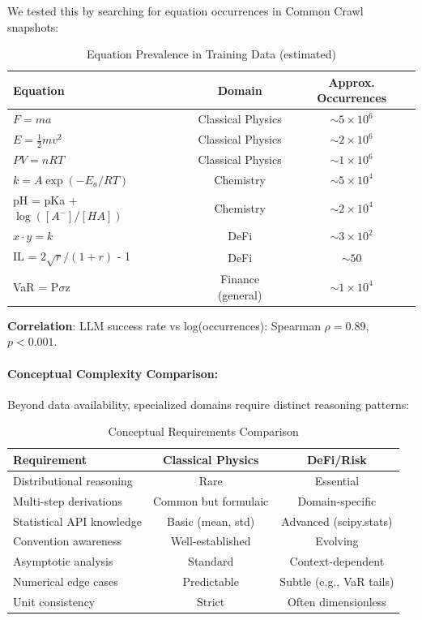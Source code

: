 \documentclass[twoside,11pt]{article}
\begin{document}
We tested this by searching for equation occurrences in Common Crawl snapshots:

\begin{table}[H]
\centering
\caption{Equation Prevalence in Training Data (estimated)}
\label{tab:equation_prevalence}
\begin{tabular}{@{}lcc@{}}
\toprule
\textbf{Equation} & \textbf{Domain} & \textbf{Approx. Occurrences} \\
\midrule
$F = ma$ & Classical Physics & $\sim 5 \times 10^6$ \\
$E = \frac{1}{2}mv^2$ & Classical Physics & $\sim 2 \times 10^6$ \\
$PV = nRT$ & Classical Physics & $\sim 1 \times 10^6$ \\
$k = A\exp(-E_a/RT)$ & Chemistry & $\sim 5 \times 10^4$ \\
pH = pKa + $\log([A^{-}]/[HA])$ & Chemistry & $\sim 2 \times 10^4$ \\
$x \cdot y = k$ & DeFi & $\sim 3 \times 10^2$ \\
IL = 2$\sqrt{r}/(1+r)$ - 1 & DeFi & $\sim 50$ \\
VaR = P$\sigma$z & Finance (general) & $\sim 1 \times 10^4$ \\
\bottomrule
\end{tabular}
\end{table}

\textbf{Correlation}: LLM success rate vs log(occurrences): Spearman $\rho = 0.89$, $p < 0.001$.

\paragraph{Conceptual Complexity Comparison:}

Beyond data availability, specialized domains require distinct reasoning patterns:

\begin{table}[H]
\centering
\caption{Conceptual Requirements Comparison}
\label{tab:conceptual_complexity}
\begin{tabular}{@{}lcc@{}}
\toprule
\textbf{Requirement} & \textbf{Classical Physics} & \textbf{DeFi/Risk} \\
\midrule
Distributional reasoning & Rare & Essential \\
Multi-step derivations & Common but formulaic & Domain-specific \\
Statistical API knowledge & Basic (mean, std) & Advanced (scipy.stats) \\
Convention awareness & Well-established & Evolving \\
Asymptotic analysis & Standard & Context-dependent \\
Numerical edge cases & Predictable & Subtle (e.g., VaR tails) \\
Unit consistency & Strict & Often dimensionless \\
\bottomrule
\end{tabular}
\end{table}
\end{document}
